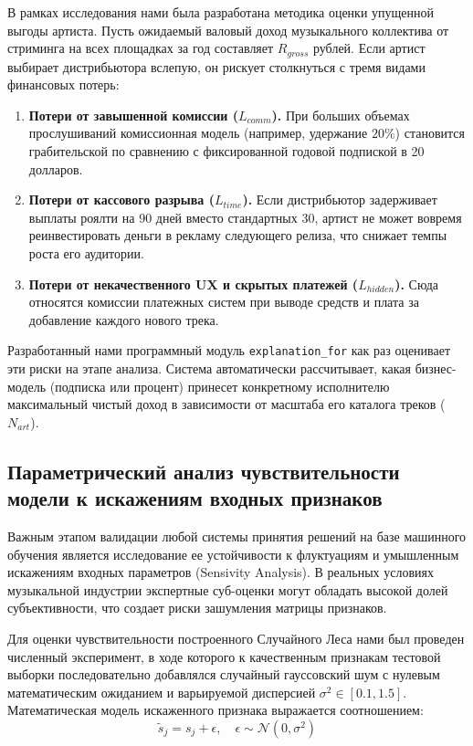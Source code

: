 \documentclass[14pt, a4paper]{extarticle}
\begin{document}
В рамках исследования нами была разработана методика оценки упущенной выгоды артиста. Пусть ожидаемый валовый доход музыкального коллектива от стриминга на всех площадках за год составляет $R_{gross}$ рублей. Если артист выбирает дистрибьютора вслепую, он рискует столкнуться с тремя видами финансовых потерь:
\begin{enumerate}
    \item \textbf{Потери от завышенной комиссии ($L_{comm}$).} При больших объемах прослушиваний комиссионная модель (например, удержание $20\%$) становится грабительской по сравнению с фиксированной годовой подпиской в 20 долларов.
    \item \textbf{Потери от кассового разрыва ($L_{time}$).} Если дистрибьютор задерживает выплаты роялти на 90 дней вместо стандартных 30, артист не может вовремя реинвестировать деньги в рекламу следующего релиза, что снижает темпы роста его аудитории.
    \item \textbf{Потери от некачественного UX и скрытых платежей ($L_{hidden}$).} Сюда относятся комиссии платежных систем при выводе средств и плата за добавление каждого нового трека.
\end{enumerate}

Разработанный нами программный модуль \texttt{explanation\_for} как раз оценивает эти риски на этапе анализа. Система автоматически рассчитывает, какая бизнес-модель (подписка или процент) принесет конкретному исполнителю максимальный чистый доход в зависимости от масштаба его каталога треков ($N_{art}$).
\subsection{Параметрический анализ чувствительности модели к искажениям входных признаков}

Важным этапом валидации любой системы принятия решений на базе машинного обучения является исследование ее устойчивости к флуктуациям и умышленным искажениям входных параметров (Sensivity Analysis). В реальных условиях музыкальной индустрии экспертные суб-оценки могут обладать высокой долей субъективности, что создает риски зашумления матрицы признаков.

Для оценки чувствительности построенного Случайного Леса нами был проведен численный эксперимент, в ходе которого к качественным признакам тестовой выборки последовательно добавлялся случайный гауссовский шум с нулевым математическим ожиданием и варьируемой дисперсией $\sigma^2 \in [0.1, 1.5]$. Математическая модель искаженного признака выражается соотношением:
\begin{equation}
\tilde{s}_j = s_j + \epsilon, \quad \epsilon \sim \mathcal{N}(0, \sigma^2)
\end{equation}
\end{document}

